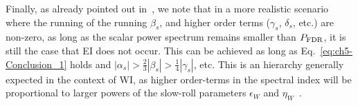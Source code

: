 {}Finally, as already pointed out in~\cite{Kinney:2014jya}, we note
that in a more realistic scenario where the running of the running
$\beta_s$, and higher order terms ($\gamma_s$, $\delta_s$, etc.) are
non-zero,  as long as the scalar power spectrum remains smaller than
$P_{\rm{FDR}}$, it is still the case that EI does not occur. This can
be achieved as long as Eq.~\ref{eq:ch5-Conclusion_1} holds and
$|\alpha_s|>\frac{2}{3}|\beta_s|>\frac{1}{4}|\gamma_s|$, etc. This is
an hierarchy generally  expected in the context of WI, as higher
order-terms in the spectral index will be proportional to larger
powers of the slow-roll parameters $\epsilon_W$ and
$\eta_W$~\cite{Das:2022ubr}.



